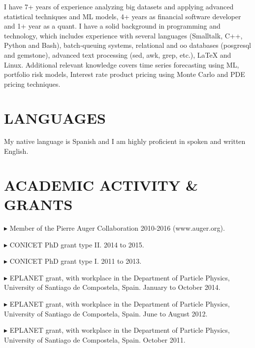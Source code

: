 \documentclass[letterpaper]{article}
\renewenvironment{itemize}{
  \begin{list}{}{
    \setlength{\leftmargin}{1.5em}
  }
}{
  \end{list}
}
\begin{document}
I have 7+ years of experience analyzing big datasets and applying advanced statistical techniques and ML models, 4+ years as financial software developer and 1+ year as a quant. I have a solid background in programming and technology, which includes experience with several languages (Smalltalk, C++, Python and Bash), batch-queuing systems, relational and oo databases (posgresql and gemstone), advanced text processing (sed, awk, grep, etc.), \LaTeX{} and Linux. Additional relevant knowledge covers time series forecasting using ML, portfolio risk models, Interest rate product pricing using Monte Carlo and PDE pricing techniques. 


\section*{LANGUAGES}

My native language is Spanish and I am highly proficient in spoken and written English.

\section*{ACADEMIC ACTIVITY \& GRANTS} 
   \begin{itemize} \itemsep -0pt  %
   \item $\blacktriangleright$ Member of the Pierre Auger Collaboration 2010-2016 (www.auger.org).
   \item $\blacktriangleright$ CONICET PhD grant type II. 2014 to 2015. 
   \item $\blacktriangleright$ CONICET PhD grant type I. 2011 to 2013. 
   \item $\blacktriangleright$ EPLANET grant, with workplace in the Department of Particle Physics, University of Santiago de Compostela, Spain. January to October 2014.
   \item $\blacktriangleright$ EPLANET grant, with workplace in the Department of Particle Physics, University of Santiago de Compostela, Spain. June to August 2012.
   \item $\blacktriangleright$ EPLANET grant, with workplace in the Department of Particle Physics, University of Santiago de Compostela, Spain. October 2011.
 \end{itemize}

 
\end{document}
